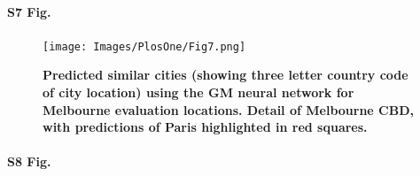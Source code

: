 \documentclass[10pt,letterpaper,hidelinks]{article}
\begin{document}

\paragraph*{S7 Fig.}
\begin{figure}[!htbp]
\centering     
\texttt{[image: Images/PlosOne/Fig7.png]} 
\caption{\bf Predicted similar cities (showing three letter country code of city location) using the GM neural network for Melbourne evaluation locations. Detail of Melbourne CBD, with predictions of Paris highlighted in red squares.}    
 \label{fig:melmapscbd}  
\end{figure} 

\paragraph*{S8 Fig.}
\end{document}
